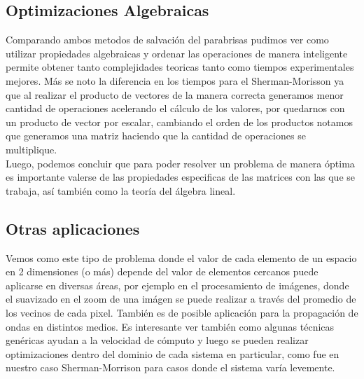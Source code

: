 \VER

\subsection{Optimizaciones Algebraicas}

Comparando ambos metodos de salvación del parabrisas pudimos ver como utilizar propiedades algebraicas y ordenar las operaciones de manera inteligente permite obtener tanto complejidades teoricas tanto como tiempos experimentales mejores. Más se noto la diferencia en los tiempos para el Sherman-Morisson ya que al realizar el producto de vectores de la manera correcta generamos menor cantidad de operaciones acelerando el cálculo de los valores, por quedarnos con un producto de vector por escalar, cambiando el orden de los productos notamos que generamos una matriz haciendo que la cantidad de operaciones se multiplique.
\\
Luego, podemos concluir que para poder resolver un problema de manera óptima es importante valerse de las propiedades especificas de las matrices con las que se trabaja, así también como la teoría del álgebra lineal.

\subsection{Otras aplicaciones}

Vemos como este tipo de problema donde el valor de cada elemento de un espacio en 2 dimensiones (o m\'as) depende del valor de elementos cercanos puede aplicarse en diversas \'areas, por ejemplo en el procesamiento de im\'agenes, donde el suavizado en el zoom de una im\'agen se puede realizar a trav\'es del promedio de los vecinos de cada pixel. Tambi\'en es de posible aplicaci\'on para la propagaci\'on de ondas en distintos medios. Es interesante ver tambi\'en como algunas t\'ecnicas gen\'ericas ayudan a la velocidad de c\'omputo y luego se pueden realizar optimizaciones dentro del dominio de cada sistema en particular, como fue en nuestro caso Sherman-Morrison para casos donde el sistema var\'ia levemente.
